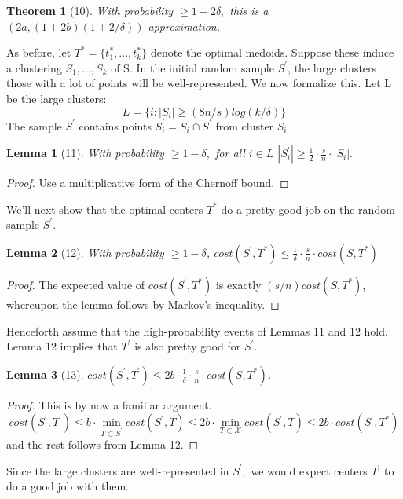 \documentclass[letterpaper,10pt]{article}
\theoremstyle{plain}
\newtheorem{lemma}{Lemma}
\newtheorem{theorem}{Theorem}
\begin{document}
\begin{theorem}[10]
With probability $\ge1-2\delta,$ this is a $(2a,(1+2b)(1+2/\delta))$ approximation. 
\end{theorem}

As before, let $T^{*}=\{t_{1}^{*},...,t_{k}^{*}\}$ denote the optimal medoids.  Suppose these induce a clustering $S_{1},...,S_{k}$ of S.  In the initial random sample $S^{\prime}$, the large clusters those with a lot of points will be well-represented.  We now formalize this.  Let L be the large clusters: 
\[
L=\{i:|S_{i}|\ge(8n/s)log(k/\delta)\}
\]
The sample $S^{\prime}$ contains points $S_{i}^{\prime}=S_{i}\cap S^{\prime}$ from cluster $S_{i}$ 

\begin{lemma}[11]
With probability $\ge1-\delta,$ for all $i\in L$ $|S_{i}^{\prime}|\ge\frac{1}{2}\cdot\frac{s}{n}\cdot|S_{i}|.$ 
\end{lemma}
\begin{proof}
Use a multiplicative form of the Chernoff bound. 
\end{proof}

We'll next show that the optimal centers $T^{*}$ do a pretty good job on the random sample $S^{\prime}$. 

\begin{lemma}[12]
With probability $\ge1-\delta$, $cost(S^{\prime},T^{*})\le\frac{1}{\delta}\cdot\frac{s}{n}\cdot cost(S,T^{*})$ 
\end{lemma}
\begin{proof}
The expected value of $cost(S^{\prime},T^{*})$ is exactly $(s/n)cost(S,T^{*})$, whereupon the lemma follows by Markov's inequality. 
\end{proof}
Henceforth assume that the high-probability events of Lemmas 11 and 12 hold.  Lemma 12 implies that $T^{\prime}$ is also pretty good for $S^{\prime}.$ 

\begin{lemma}[13]
$cost(S^{\prime},T^{\prime})\le2b\cdot\frac{1}{\delta}\cdot\frac{s}{n}\cdot cost(S,T^{*})$. 
\end{lemma}
\begin{proof}
This is by now a familiar argument. 
\[
cost(S^{\prime},T^{\prime})\le b\cdot \min_{T\subset S^{\prime}}cost(S^{\prime},T)\le2b\cdot \min_{T\subset\mathcal{X}}cost(S^{\prime},T)\le2b\cdot cost(S^{\prime},T^{*})
\]
and the rest follows from Lemma 12. 
\end{proof}

Since the large clusters are well-represented in $S^{\prime},$ we would expect centers $T^{\prime}$ to do a good job with them. 
\end{document}
